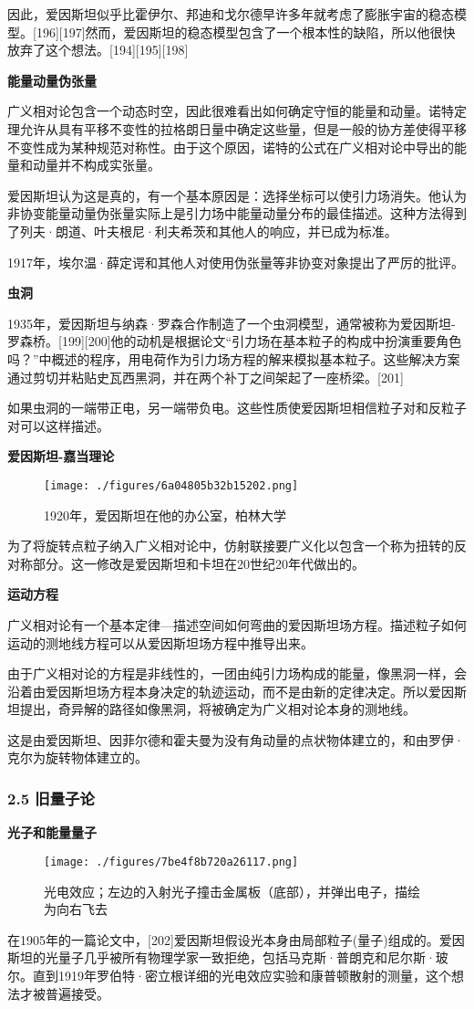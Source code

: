 因此，爱因斯坦似乎比霍伊尔、邦迪和戈尔德早许多年就考虑了膨胀宇宙的稳态模型。[196][197]然而，爱因斯坦的稳态模型包含了一个根本性的缺陷，所以他很快放弃了这个想法。[194][195][198]

\textbf{能量动量伪张量}

广义相对论包含一个动态时空，因此很难看出如何确定守恒的能量和动量。诺特定理允许从具有平移不变性的拉格朗日量中确定这些量，但是一般的协方差使得平移不变性成为某种规范对称性。由于这个原因，诺特的公式在广义相对论中导出的能量和动量并不构成实张量。

爱因斯坦认为这是真的，有一个基本原因是：选择坐标可以使引力场消失。他认为非协变能量动量伪张量实际上是引力场中能量动量分布的最佳描述。这种方法得到了列夫·朗道、叶夫根尼·利夫希茨和其他人的响应，并已成为标准。

1917年，埃尔温·薛定谔和其他人对使用伪张量等非协变对象提出了严厉的批评。

\textbf{虫洞}

1935年，爱因斯坦与纳森·罗森合作制造了一个虫洞模型，通常被称为爱因斯坦-罗森桥。[199][200]他的动机是根据论文“引力场在基本粒子的构成中扮演重要角色吗？”中概述的程序，用电荷作为引力场方程的解来模拟基本粒子。这些解决方案通过剪切并粘贴史瓦西黑洞，并在两个补丁之间架起了一座桥梁。[201]

如果虫洞的一端带正电，另一端带负电。这些性质使爱因斯坦相信粒子对和反粒子对可以这样描述。

\textbf{爱因斯坦-嘉当理论}

\begin{figure}[ht]
\centering
\texttt{[image: ./figures/6a04805b32b15202.png]}
\caption{1920年，爱因斯坦在他的办公室，柏林大学} \label{fig_AYST_18}
\end{figure}
为了将旋转点粒子纳入广义相对论中，仿射联接要广义化以包含一个称为扭转的反对称部分。这一修改是爱因斯坦和卡坦在20世纪20年代做出的。

\textbf{运动方程}

广义相对论有一个基本定律—描述空间如何弯曲的爱因斯坦场方程。描述粒子如何运动的测地线方程可以从爱因斯坦场方程中推导出来。

由于广义相对论的方程是非线性的，一团由纯引力场构成的能量，像黑洞一样，会沿着由爱因斯坦场方程本身决定的轨迹运动，而不是由新的定律决定。所以爱因斯坦提出，奇异解的路径如像黑洞，将被确定为广义相对论本身的测地线。

这是由爱因斯坦、因菲尔德和霍夫曼为没有角动量的点状物体建立的，和由罗伊·克尔为旋转物体建立的。

\subsubsection{2.5 旧量子论}
\textbf{光子和能量量子}
\begin{figure}[ht]
\centering
\texttt{[image: ./figures/7be4f8b720a26117.png]}
\caption{光电效应；左边的入射光子撞击金属板（底部），并弹出电子，描绘为向右飞去} \label{fig_AYST_19}
\end{figure}
在1905年的一篇论文中，[202]爱因斯坦假设光本身由局部粒子(量子)组成的。爱因斯坦的光量子几乎被所有物理学家一致拒绝，包括马克斯·普朗克和尼尔斯·玻尔。直到1919年罗伯特·密立根详细的光电效应实验和康普顿散射的测量，这个想法才被普遍接受。

